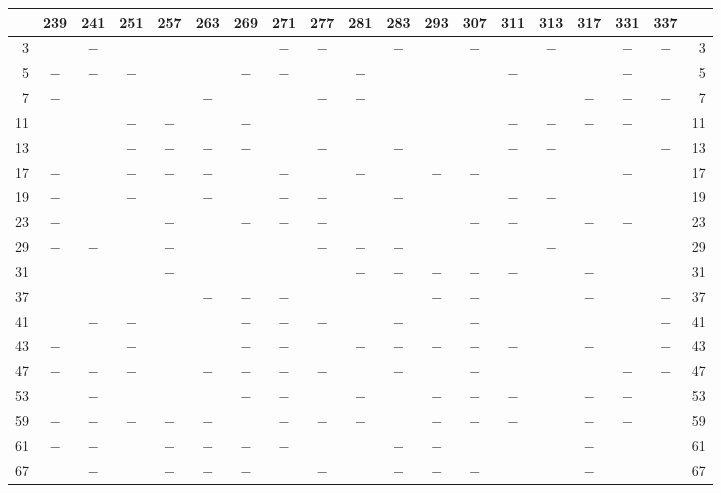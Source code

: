 \begin{center}\begingroup\fontsize{8}{10.5}\selectfont\setlength{\tabcolsep}{2pt}
\begin{tabular}{r|c|c|c|c|c|c|c|c|c|c|c|c|c|c|c|c|c|r}
\hline
 & 239 & 241 & 251 & 257 & 263 & 269 & 271 & 277 & 281 & 283 & 293 & 307 & 311 & 313 & 317 & 331 & 337 & \\
\hline
3 &  & $-$ &  &  &  &  & $-$ & $-$ &  & $-$ &  & $-$ &  & $-$ &  & $-$ & $-$ & 3\\
5 & $-$ & $-$ & $-$ &  &  & $-$ & $-$ &  & $-$ &  &  &  & $-$ &  &  & $-$ &  & 5\\
7 & $-$ &  &  &  & $-$ &  &  & $-$ & $-$ &  &  &  &  &  & $-$ & $-$ & $-$ & 7\\
11 &  &  & $-$ & $-$ &  & $-$ &  &  &  &  &  &  & $-$ & $-$ & $-$ & $-$ &  & 11\\
13 &  &  & $-$ & $-$ & $-$ & $-$ &  & $-$ &  & $-$ &  &  & $-$ & $-$ &  &  & $-$ & 13\\
17 & $-$ &  & $-$ & $-$ & $-$ &  & $-$ &  & $-$ &  & $-$ & $-$ &  &  &  & $-$ &  & 17\\
19 & $-$ &  & $-$ &  & $-$ &  & $-$ & $-$ &  & $-$ &  &  & $-$ & $-$ &  &  &  & 19\\
23 & $-$ &  &  & $-$ &  & $-$ & $-$ & $-$ &  &  &  & $-$ & $-$ &  & $-$ & $-$ &  & 23\\
29 & $-$ & $-$ &  & $-$ &  &  &  & $-$ & $-$ & $-$ &  &  &  & $-$ &  &  &  & 29\\
31 &  &  &  & $-$ &  &  &  &  & $-$ & $-$ & $-$ & $-$ & $-$ &  & $-$ &  &  & 31\\
37 &  &  &  &  & $-$ & $-$ & $-$ &  &  &  & $-$ & $-$ &  &  & $-$ &  & $-$ & 37\\
41 &  & $-$ & $-$ &  &  & $-$ & $-$ & $-$ &  & $-$ &  & $-$ &  &  &  &  & $-$ & 41\\
43 & $-$ &  & $-$ &  &  & $-$ & $-$ &  & $-$ & $-$ & $-$ & $-$ & $-$ &  & $-$ &  & $-$ & 43\\
47 & $-$ & $-$ & $-$ &  & $-$ & $-$ & $-$ & $-$ &  & $-$ &  & $-$ &  &  &  & $-$ & $-$ & 47\\
53 &  & $-$ &  &  &  & $-$ & $-$ &  & $-$ &  & $-$ & $-$ & $-$ &  & $-$ & $-$ &  & 53\\
59 & $-$ & $-$ & $-$ & $-$ & $-$ &  & $-$ & $-$ & $-$ &  & $-$ & $-$ & $-$ &  & $-$ & $-$ &  & 59\\
61 & $-$ & $-$ &  & $-$ & $-$ & $-$ & $-$ &  &  & $-$ & $-$ &  &  &  & $-$ &  &  & 61\\
67 &  & $-$ &  & $-$ & $-$ & $-$ &  & $-$ &  & $-$ & $-$ & $-$ &  &  & $-$ &  &  & 67\\

\end{tabular}
\end{center}
